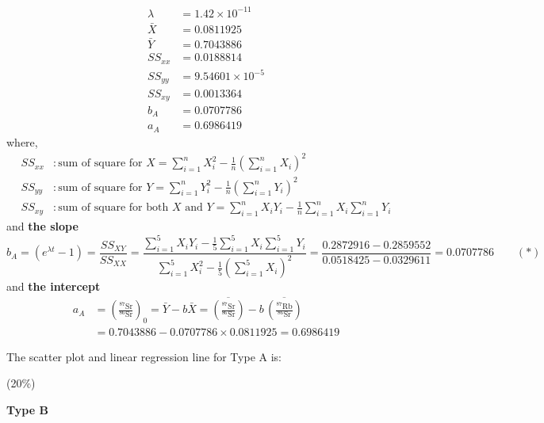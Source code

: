 \begin{description}
  \begin{align*}
    \lambda &= 1.42 \times 10^{-11}\\
    \bar{X} &= 0.0811925\\
    \bar{Y} &= 0.7043886\\
    SS_{xx} &= 0.0188814\\
    SS_{yy} &= 9.54601 \times 10^{-5}\\
    SS_{xy} &= 0.0013364\\
    b_A &= 0.0707786\\
    a_A &= 0.6986419
  \end{align*}
  where,
  \begin{align*}
    SS_{xx}&: \text{sum of square for } X
      = \sum_{i=1}^{n} X_i^2
        - \frac{1}{n}\left(\sum_{i=1}^{n} X_i\right)^{2}\\
    SS_{yy}&: \text{sum of square for } Y
      = \sum_{i=1}^{n} Y_i^2
        - \frac{1}{n}\left(\sum_{i=1}^{n} Y_i\right)^{2}\\
    SS_{xy}&: \text{sum of square for both } X \text{ and } Y
      = \sum_{i=1}^{n} X_i Y_i
        - \frac{1}{n}\sum_{i=1}^{n} X_i \sum_{i=1}^{n} Y_i
  \end{align*}
  and \textbf{the slope}
  \[
    b_A = \left(e^{\lambda t} - 1\right) = \frac{SS_{XY}}{SS_{XX}}
    = \frac{\displaystyle\sum_{i=1}^{5} X_i Y_i
        - \frac{1}{5}\sum_{i=1}^{5} X_i \sum_{i=1}^{5} Y_i}
      {\displaystyle\sum_{i=1}^{5} X_i^2
        - \frac{1}{5}\left(\sum_{i=1}^{5} X_i\right)^{2}}
    = \frac{0.2872916 - 0.2859552}{0.0518425 - 0.0329611}
    = 0.0707786 \qquad (*)
  \]
  and \textbf{the intercept}
  \begin{align*}
    a_A &= \left(\frac{^{87}\mathrm{Sr}}{^{86}\mathrm{Sr}}\right)_0
      = \bar{Y} - b\bar{X}
      = \overline{\left(\frac{^{87}\mathrm{Sr}}{^{86}\mathrm{Sr}}\right)}
        - b\,\overline{\left(\frac{^{87}\mathrm{Rb}}{^{86}\mathrm{Sr}}\right)}\\
      &= 0.7043886 - 0.0707786 \times 0.0811925 = 0.6986419
  \end{align*}

  The scatter plot and linear regression line for Type A is:

  \hfill(20\%)

  \begin{center}
    \textbf{Type B}


\end{center}
\end{description}
